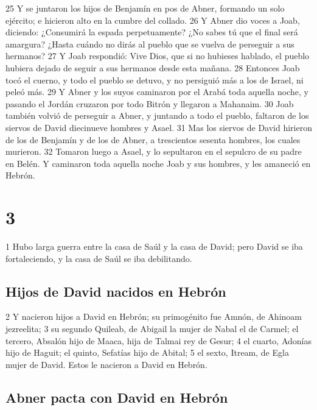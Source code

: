 25 Y se juntaron los hijos de Benjamín en pos de Abner, formando un solo ejército; e hicieron alto en la cumbre del collado.
26 Y Abner dio voces a Joab, diciendo: ¿Consumirá la espada perpetuamente? ¿No sabes tú que el final será amargura? ¿Hasta cuándo no dirás al pueblo que se vuelva de perseguir a sus hermanos?
27 Y Joab respondió: Vive Dios, que si no hubieses hablado, el pueblo hubiera dejado de seguir a sus hermanos desde esta mañana.
28 Entonces Joab tocó el cuerno, y todo el pueblo se detuvo, y no persiguió más a los de Israel, ni peleó más.
29 Y Abner y los suyos caminaron por el Arabá toda aquella noche, y pasando el Jordán cruzaron por todo Bitrón y llegaron a Mahanaim.
30 Joab también volvió de perseguir a Abner, y juntando a todo el pueblo, faltaron de los siervos de David diecinueve hombres y Asael.
31 Mas los siervos de David hirieron de los de Benjamín y de los de Abner, a trescientos sesenta hombres, los cuales murieron.
32 Tomaron luego a Asael, y lo sepultaron en el sepulcro de su padre en Belén. Y caminaron toda aquella noche Joab y sus hombres, y les amaneció en Hebrón. 

\chapter{3}


1 Hubo larga guerra entre la casa de Saúl y la casa de David; pero David se iba fortaleciendo, y la casa de Saúl se iba debilitando.
\section*{Hijos de David nacidos en Hebrón}

 
2 Y nacieron hijos a David en Hebrón; su primogénito fue Amnón, de Ahinoam jezreelita;
3 su segundo Quileab, de Abigail la mujer de Nabal el de Carmel; el tercero, Absalón hijo de Maaca, hija de Talmai rey de Gesur;
4 el cuarto, Adonías hijo de Haguit; el quinto, Sefatías hijo de Abital;
5 el sexto, Itream, de Egla mujer de David. Estos le nacieron a David en Hebrón.
\section*{Abner pacta con David en Hebrón}

